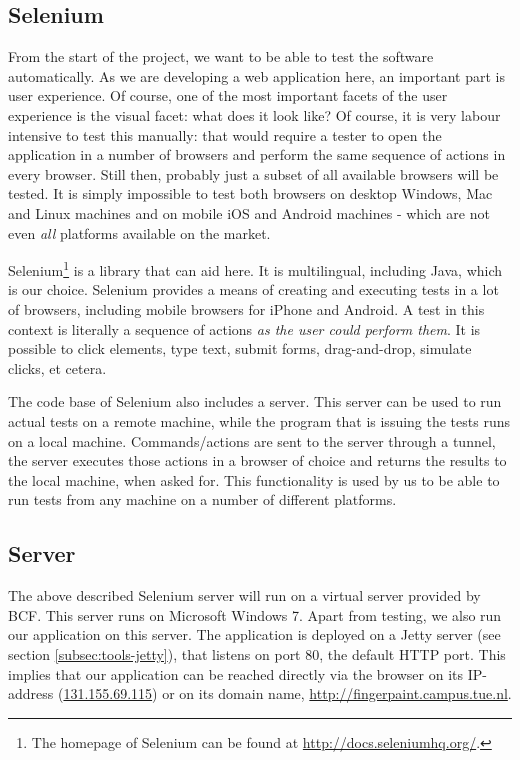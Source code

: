 \subsection{Selenium}
\label{subsec:tools-selenium}
From the start of the project, we want to be able to test the software automatically. As we are developing a web application here, an important part is user experience. Of course, one of the most important facets of the user experience is the visual facet: what does it look like? Of course, it is very labour intensive to test this manually: that would require a tester to open the application in a number of browsers and perform the same sequence of actions in every browser. Still then, probably just a subset of all available browsers will be tested. It is simply impossible to test both browsers on desktop Windows, Mac and Linux machines and on mobile iOS and Android machines - which are not even \emph{all} platforms available on the market.

Selenium\footnote{The homepage of Selenium can be found at \url{http://docs.seleniumhq.org/}.} is a library that can aid here. It is multilingual, including Java, which is our choice. Selenium provides a means of creating and executing tests in a lot of browsers, including mobile browsers for iPhone and Android. A test in this context is literally a sequence of actions \emph{as the user could perform them}. It is possible to click elements, type text, submit forms, drag-and-drop, simulate clicks, et cetera.

The code base of Selenium also includes a server. This server can be used to run actual tests on a remote machine, while the program that is issuing the tests runs on a local machine. Commands/actions are sent to the server through a tunnel, the server executes those actions in a browser of choice and returns the results to the local machine, when asked for. This functionality is used by us to be able to run tests from any machine on a number of different platforms.

\subsection{Server}
\label{subsec:tools-server}
The above described Selenium server will run on a virtual server provided by BCF. This server runs on Microsoft Windows 7. Apart from testing, we also run our application on this server. The application is deployed on a Jetty server (see section \ref{subsec:tools-jetty}), that listens on port 80, the default HTTP port. This implies that our application can be reached directly via the browser on its IP-address (\url{131.155.69.115}) or on its domain name, \url{http://fingerpaint.campus.tue.nl}.

